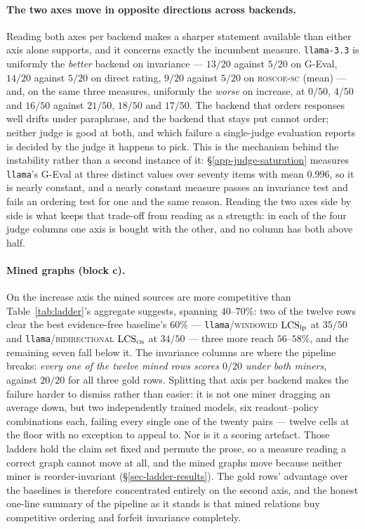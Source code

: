 \paragraph{The two axes move in opposite directions across backends.} Reading both axes per backend makes a
sharper statement available than either axis alone supports, and it concerns exactly the incumbent measure.
\texttt{llama-3.3} is uniformly the \emph{better} backend on invariance --- $13/20$ against $5/20$ on G-Eval,
$14/20$ against $5/20$ on direct rating, $9/20$ against $5/20$ on \textsc{roscoe-sc} (mean) --- and, on the
same three measures, uniformly the \emph{worse} on increase, at $0/50$, $4/50$ and $16/50$ against $21/50$,
$18/50$ and $17/50$. The backend that orders responses well drifts under paraphrase, and the backend that
stays put cannot order; neither judge is good at both, and which failure a single-judge evaluation reports is
decided by the judge it happens to pick. This is the mechanism behind the instability rather than a second
instance of it: \S\ref{app-judge-saturation} measures \texttt{llama}'s G-Eval at three distinct values over
seventy items with mean $0.996$, so it is nearly constant, and a nearly constant measure passes an invariance
test and fails an ordering test for one and the same reason. Reading the two axes side by side is what keeps
that trade-off from reading as a strength: in each of the four judge columns one axis is bought with the other,
and no column has both above half.

\paragraph{Mined graphs (block \textbf{c}).} On the increase axis the mined sources are more competitive than
Table~\ref{tab:ladder}'s aggregate suggests, spanning $40$--$70\%$: two of the twelve rows clear the best
evidence-free baseline's $60\%$ --- \texttt{llama}/\textsc{windowed} $\mathrm{LCS}_{\mathrm{lp}}$ at $35/50$ and
\texttt{llama}/\textsc{bidirectional} $\mathrm{LCS}_{\mathrm{cn}}$ at $34/50$ --- three more reach $56$--$58\%$, and the
remaining seven fall below it. The invariance columns are where the pipeline breaks: \emph{every one of the
twelve mined rows scores $0/20$ under both miners}, against $20/20$ for all three gold rows. Splitting that
axis per backend makes the failure harder to dismiss rather than easier: it is not one miner dragging an
average down, but two independently trained models, six readout--policy combinations each, failing every
single one of the twenty pairs --- twelve cells at the floor with no exception to appeal to. Nor is it a
scoring artefact. Those ladders hold the claim set fixed and permute the prose, so a measure reading a correct
graph cannot move at all, and the mined graphs move because neither miner is reorder-invariant
(\S\ref{sec-ladder-results}). The gold rows' advantage over the baselines is therefore concentrated entirely
on the second axis, and the honest one-line summary of the pipeline as it stands is that mined relations buy
competitive ordering and forfeit invariance completely.

